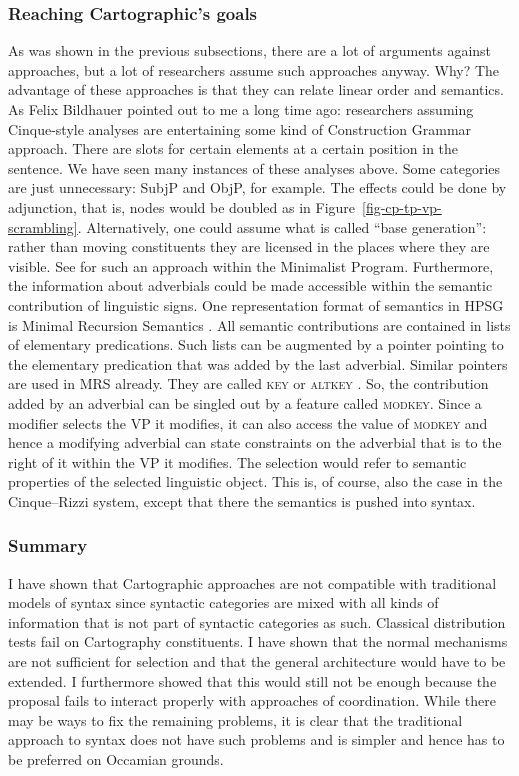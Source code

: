 \subsubsection{Reaching Cartographic's goals}
\label{sec-Cinque-solution}

As was shown in the previous subsections, there are a lot of arguments against
\citeauthor{CR2010a} approaches, but a lot of researchers assume such approaches anyway. Why? The
advantage of these approaches is that they can relate linear order and semantics. As Felix Bildhauer
pointed out to me a long time ago: researchers assuming Cinque-style analyses are entertaining some kind of Construction Grammar
approach. There are slots for certain elements at a certain position in the sentence. We have seen
many instances of these analyses above. Some categories are just unnecessary: SubjP and ObjP, for
example. The effects could be done by adjunction, that is, nodes would be doubled as in
Figure~\ref{fig-cp-tp-vp-scrambling}. Alternatively, one could assume what is called ``base
generation'': rather than moving constituents they are licensed in the places where they are visible. See
\citet{Fanselow2001a} for such an approach within the Minimalist Program.
Furthermore, the information about adverbials could be made accessible
within the semantic contribution of linguistic signs. One representation format of semantics in HPSG
is Minimal Recursion Semantics \citep{CFPS2005a}. All semantic contributions are contained in lists of elementary
predications. Such lists can be augmented by a pointer pointing to the elementary predication that
was added by the last adverbial. Similar pointers are used in MRS already. They are called
\textsc{key} or \textsc{altkey} \parencites[Section~3.7]{FBO2003a-u}[]{CFPS2005a}. So, the contribution added by an adverbial can be singled out by a
feature called \textsc{modkey}. Since a modifier selects the VP it modifies, it can also access the value of \textsc{modkey} and hence a
modifying adverbial can state constraints on the adverbial that is to the right of it within the VP
it modifies. The selection would refer to semantic properties of the selected linguistic
object. This is, of course, also the case in the Cinque–Rizzi system, except that there the
semantics is pushed into syntax.

\subsubsection{Summary}

I have shown that Cartographic approaches are not compatible with traditional models of syntax since
syntactic categories are mixed with all kinds of information that is not part of syntactic
categories as such. Classical distribution tests fail on Cartography constituents. I have shown that
the normal mechanisms are not sufficient for selection and that the general architecture would have
to be extended. I furthermore showed that this would still not be enough because the proposal fails
to interact properly with approaches of coordination. While there may be ways to fix the remaining
problems, it is clear that the traditional approach to syntax does not have such problems and is
simpler and hence has to be preferred on Occamian grounds.


